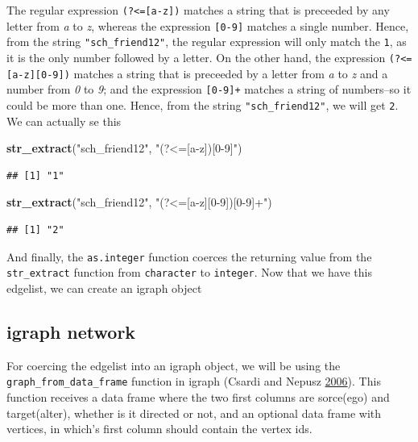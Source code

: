 \documentclass[]{book}
\newenvironment{Shaded}{\begin{snugshade}}{\end{snugshade}}
\newcommand{\KeywordTok}[1]{\textcolor[rgb]{0.13,0.29,0.53}{\textbf{#1}}}
\newcommand{\StringTok}[1]{\textcolor[rgb]{0.31,0.60,0.02}{#1}}
\newcommand{\NormalTok}[1]{#1}
\theoremstyle{definition}
\theoremstyle{definition}
\theoremstyle{definition}
\theoremstyle{remark}
\begin{document}
\begin{enumerate}
  The regular expression \texttt{(?\textless{}={[}a-z{]})} matches a
  string that is preceeded by any letter from \emph{a} to \emph{z},
  whereas the expression \texttt{{[}0-9{]}} matches a single number.
  Hence, from the string \texttt{"sch\_friend12"}, the regular
  expression will only match the \texttt{1}, as it is the only number
  followed by a letter. On the other hand, the expression
  \texttt{(?\textless{}={[}a-z{]}{[}0-9{]})} matches a string that is
  preceeded by a letter from \emph{a} to \emph{z} and a number from
  \emph{0} to \emph{9}; and the expression \texttt{{[}0-9{]}+} matches a
  string of numbers--so it could be more than one. Hence, from the
  string \texttt{"sch\_friend12"}, we will get \texttt{2}. We can
  actually se this

\begin{Shaded}
\begin{Highlighting}[]
\KeywordTok{str_extract}\NormalTok{(}\StringTok{"sch_friend12"}\NormalTok{, }\StringTok{"(?<=[a-z])[0-9]"}\NormalTok{)}
\end{Highlighting}
\end{Shaded}

\begin{verbatim}
## [1] "1"
\end{verbatim}

\begin{Shaded}
\begin{Highlighting}[]
\KeywordTok{str_extract}\NormalTok{(}\StringTok{"sch_friend12"}\NormalTok{, }\StringTok{"(?<=[a-z][0-9])[0-9]+"}\NormalTok{)}
\end{Highlighting}
\end{Shaded}

\begin{verbatim}
## [1] "2"
\end{verbatim}

  And finally, the \texttt{as.integer} function coerces the returning
  value from the \texttt{str\_extract} function from \texttt{character}
  to \texttt{integer}. Now that we have this edgelist, we can create an
  igraph object
\end{enumerate}

\subsection{igraph network}\label{igraph-network}

For coercing the edgelist into an igraph object, we will be using the
\texttt{graph\_from\_data\_frame} function in igraph (Csardi and Nepusz
\protect\hyperlink{ref-R-igraph}{2006}). This function receives a data
frame where the two first columns are sorce(ego) and target(alter),
whether is it directed or not, and an optional data frame with vertices,
in which's first column should contain the vertex ids.
\end{document}
